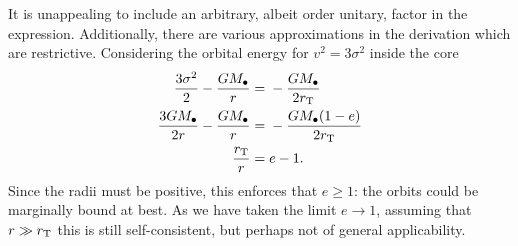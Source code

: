 It is unappealing to include an arbitrary, albeit order unitary, factor in the expression. Additionally, there are various approximations in the derivation which are restrictive. Considering the orbital energy for $v^2 = 3\sigma^2$ inside the core
\begin{align}
\frac{3\sigma^2}{2} - \frac{GM_\bullet}{r} = {} & -\frac{GM_\bullet}{2r_\mathrm{T}} \\
\frac{3GM_\bullet}{2r} - \frac{GM_\bullet}{r} = {} & -\frac{GM_\bullet(1-e)}{2r_\mathrm{T}} \\
\frac{r_\mathrm{T}}{r} = {} & e - 1.
\end{align}
Since the radii must be positive, this enforces that $e \geq 1$: the orbits could be marginally bound at best. As we have taken the limit $e \rightarrow 1$, assuming that $r \gg r_\mathrm{T}$ this is still self-consistent, but perhaps not of general applicability.